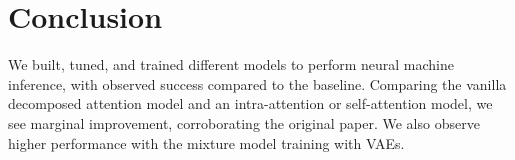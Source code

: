 \documentclass[11pt]{article}
\begin{document}






\section{Conclusion}
We built, tuned, and trained different models to perform neural machine inference, with observed success compared to the baseline. Comparing the vanilla decomposed attention model and an intra-attention or self-attention model, we see marginal improvement, corroborating the original paper. We also observe higher performance with the mixture model training with VAEs.
\end{document}
